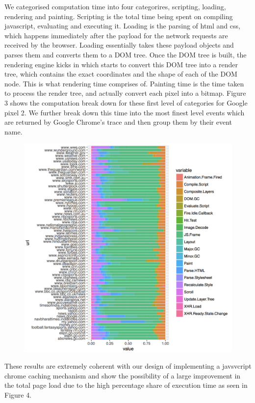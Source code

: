 We categorised computation time into four categorires, scripting, loading, rendering and
painting. Scripting is the total time being spent on
compiling javascript, evaluating and executing it. Loading is the parsing of html and css, which happens 
immediately after the payload for the network requests are received by the browser. Loading essentially
takes these payload objects and parses them and converts them to a DOM tree. Once the DOM tree is built,
the rendering engine kicks in which starts to convert this DOM tree into a render tree, which contains the
exact coordinates and the shape of each of the DOM node. This is what rendering time comprises of. 
Painting time is the time taken to process the render tree, and actually convert
each pixel into a bitmap.
Figure 3 shows the computation break down for these first level of categories
for Google pixel 2. We further break down this time into the most finest level events
which are returned by Google Chrome's trace and then group them by their event name.

\begin{figure}[t!]
\centering
\includegraphics[width=0.9\columnwidth]{figs/act_p2.png}
\label{fig:cat_p2}
\end{figure}


These results are extremely coherent with our design of implementing a javsvcript chrome
caching mechanism and show the possibility of a large improvement in the total page
load due to the high percentage share of execution time as seen in Figure 4. 

